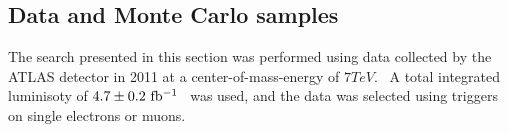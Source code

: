 

\subsection{Data and Monte Carlo samples}\label{sect:samples}

The search presented in this section was performed using data collected by the ATLAS detector in 2011 at a center-of-mass-energy of $7 TeV$.~\cite{1748-0221-3-08-S08003}
A total integrated luminisoty of $4.7\pm0.2~\mbox{fb$^{-1}$}{}$~\cite{Aad:2011dr,ATLAS-CONF-2011-116} was used, and the data was selected using triggers on single electrons or muons.




